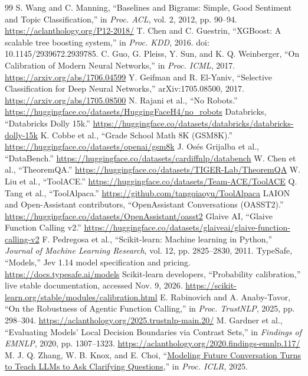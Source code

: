 \documentclass[conference]{IEEEtran}
\begin{document}
\begin{thebibliography}{99}
 S. Wang and C. Manning, ``Baselines and Bigrams: Simple, Good Sentiment and Topic Classification,'' in \emph{Proc. ACL}, vol. 2, 2012, pp. 90--94. \url{https://aclanthology.org/P12-2018/}
 T. Chen and C. Guestrin, ``XGBoost: A scalable tree boosting system,'' in \emph{Proc. KDD}, 2016. doi: 10.1145/2939672.2939785.
 C. Guo, G. Pleiss, Y. Sun, and K. Q. Weinberger, ``On Calibration of Modern Neural Networks,'' in \emph{Proc. ICML}, 2017. \url{https://arxiv.org/abs/1706.04599}
 Y. Geifman and R. El-Yaniv, ``Selective Classification for Deep Neural Networks,'' arXiv:1705.08500, 2017. \url{https://arxiv.org/abs/1705.08500}
 N. Rajani et al., ``No Robots.'' \url{https://huggingface.co/datasets/HuggingFaceH4/no_robots}
 Databricks, ``Databricks Dolly 15k.'' \url{https://huggingface.co/datasets/databricks/databricks-dolly-15k}
 K. Cobbe et al., ``Grade School Math 8K (GSM8K).'' \url{https://huggingface.co/datasets/openai/gsm8k}
 J. Os\'es Grijalba et al., ``DataBench.'' \url{https://huggingface.co/datasets/cardiffnlp/databench}
 W. Chen et al., ``TheoremQA.'' \url{https://huggingface.co/datasets/TIGER-Lab/TheoremQA}
 W. Liu et al., ``ToolACE.'' \url{https://huggingface.co/datasets/Team-ACE/ToolACE}
 Q. Tang et al., ``ToolAlpaca.'' \url{https://github.com/tangqiaoyu/ToolAlpaca}
 LAION and Open-Assistant contributors, ``OpenAssistant Conversations (OASST2).'' \url{https://huggingface.co/datasets/OpenAssistant/oasst2}
 Glaive AI, ``Glaive Function Calling v2.'' \url{https://huggingface.co/datasets/glaiveai/glaive-function-calling-v2}
 F. Pedregosa et al., ``Scikit-learn: Machine learning in Python,'' \emph{Journal of Machine Learning Research}, vol. 12, pp. 2825--2830, 2011.
 TypeSafe, ``Models,'' Jev 1.14 model specification and pricing. \url{https://docs.typesafe.ai/models}
 Scikit-learn developers, ``Probability calibration,'' live stable documentation, accessed Nov. 9, 2026. \url{https://scikit-learn.org/stable/modules/calibration.html}
 E. Rabinovich and A. Anaby-Tavor, ``On the Robustness of Agentic Function Calling,'' in \emph{Proc. TrustNLP}, 2025, pp. 298--304. \url{https://aclanthology.org/2025.trustnlp-main.20/}
 M. Gardner et al., ``Evaluating Models' Local Decision Boundaries via Contrast Sets,'' in \emph{Findings of EMNLP}, 2020, pp. 1307--1323. \url{https://aclanthology.org/2020.findings-emnlp.117/}
 M. J. Q. Zhang, W. B. Knox, and E. Choi, ``\href{https://proceedings.iclr.cc/paper_files/paper/2025/hash/97e2df4bb8b2f1913657344a693166a2-Abstract-Conference.html}{Modeling Future Conversation Turns to Teach LLMs to Ask Clarifying Questions},'' in \emph{Proc. ICLR}, 2025.
\end{thebibliography}
\end{document}
